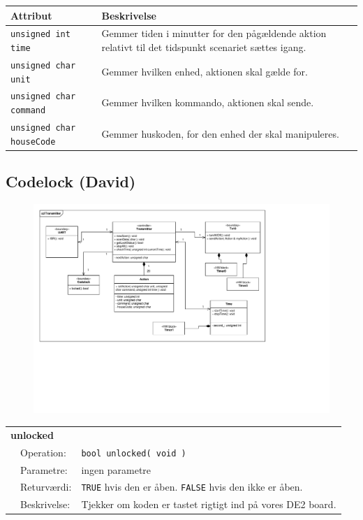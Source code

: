 \begin{table}[h]
\centering
\begin{tabularx}{13 cm}{|l |X|} \hline
Attribut & Beskrivelse \\ \hline

\texttt{unsigned int time} & Gemmer tiden i minutter for den pågældende aktion relativt til det tidspunkt scenariet sættes igang. \\ \hline
\texttt{unsigned char unit} & Gemmer hvilken enhed, aktionen skal gælde for. \\ \hline
\texttt{unsigned char command} & Gemmer hvilken kommando, aktionen skal sende. \\ \hline
\texttt{unsigned char houseCode} & Gemmer huskoden, for den enhed der skal manipuleres. \\ \hline
\end{tabularx}
\end{table}

\clearpage
\subsection{Codelock (David)}

\begin{figure}[h]
\centering
\includegraphics[scale=1,clip=true, trim=38 300 650 203]{Systemarkitektur/diagrammer/Transmitter_Klassediagram} %
\end{figure}

\begin{table}[h]
\begin{tabularx}{\textwidth}{p{0.6 cm} l X} %
\multicolumn{3}{l}{\textbf{unlocked}}\\
& Operation: & %
\texttt{bool unlocked( void )}
\\ & Parametre: & %
ingen parametre
\\ & Returværdi: & %
\texttt{TRUE} hvis den er åben. \texttt{FALSE} hvis den ikke er åben.
\\ & Beskrivelse: & %
Tjekker om koden er tastet rigtigt ind på vores DE2 board.
\\ \end{tabularx}
\end{table}

